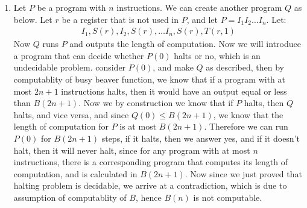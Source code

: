 \begin{enumerate}[label=]
   \item 
      Let $P$ be a program with $n$ instructions. We can create another program $Q$ as below. Let $r$ be a register that is not used in $P$, and let $P = I_1 I_2 \dots I_n$. Let:
      \begin{gather*}
         I_1, S(r), I_2, S(r), \dots I_n, S(r), T(r, 1)
      \end{gather*}
      Now $Q$ runs $P$ and outputs the length of computation. Now we will introduce a program that can decide whether $P(0)$ halts or no, which is an undecidable problem. consider $P(0)$, and make $Q$ as described, then by computablity of busy beaver function, we know that if a program with at most $2n + 1$ instructions halts, then it would have an output equal or less than $B(2n + 1)$. Now we by construction we know that if $P$ halts, then $Q$ halts, and vice versa, and since $Q(0) \le B(2n + 1)$, we know that the length of computation for $P$ is at most $B(2n + 1)$. Therefore we can run $P(0)$ for $B(2n + 1)$ steps, if it halts, then we answer yes, and if it doesn't halt, then it will never halt, since for any program with at most $n$ instructions, there is a corresponding program that computes its length of computation, and is calculated in $B(2n + 1)$. Now since we just proved that halting problem is decidable, we arrive at a contradiction, which is due to assumption of computablity of $B$, hence $B(n)$ is not computable.
\end{enumerate}